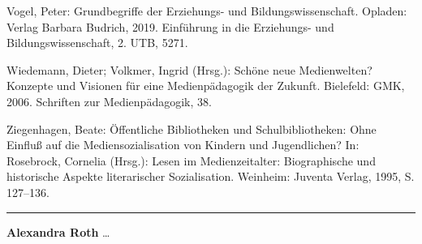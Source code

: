 \documentclass[a4paper,
fontsize=11pt,
oneside,
numbers=noperiodatend,
parskip=half-,
bibliography=totoc,
final
]{scrartcl}
\begin{document}
Vogel, Peter: Grundbegriffe der Erziehungs- und Bildungswissenschaft.
Opladen: Verlag Barbara Budrich, 2019. Einführung in die Erziehungs- und
Bildungswissenschaft, 2. UTB, 5271.

Wiedemann, Dieter; Volkmer, Ingrid (Hrsg.): Schöne neue Medienwelten?
Konzepte und Visionen für eine Medienpädagogik der Zukunft. Bielefeld:
GMK, 2006. Schriften zur Medienpädagogik, 38.

Ziegenhagen, Beate: Öffentliche Bibliotheken und Schulbibliotheken: Ohne
Einfluß auf die Mediensozialisation von Kindern und Jugendlichen? In:
Rosebrock, Cornelia (Hrsg.): Lesen im Medienzeitalter: Biographische und
historische Aspekte literarischer Sozialisation. Weinheim: Juventa
Verlag, 1995, S. 127--136.

\begin{center}\rule{0.5\linewidth}{0.5pt}\end{center}

\textbf{Alexandra Roth} \ldots{}
\end{document}
